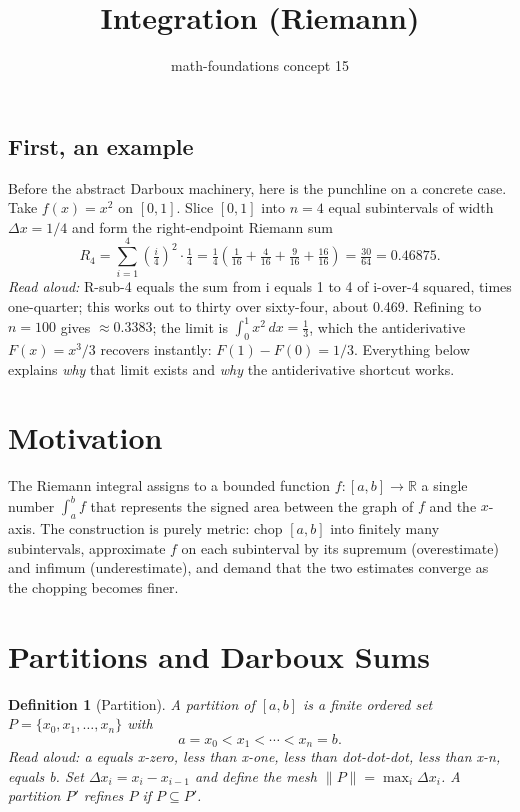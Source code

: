 \documentclass[11pt]{article}
\title{Integration (Riemann)}
\author{math-foundations concept 15}
\date{}
\newtheorem{definition}{Definition}
\begin{document}
\maketitle

\subsection*{First, an example}
Before the abstract Darboux machinery, here is the punchline on a concrete case.
Take $f(x) = x^2$ on $[0,1]$. Slice $[0,1]$ into $n=4$ equal subintervals of width
$\Delta x = 1/4$ and form the right-endpoint Riemann sum
\[ R_4 = \sum_{i=1}^{4} \left(\tfrac{i}{4}\right)^2 \cdot \tfrac{1}{4}
       = \tfrac{1}{4}\!\left(\tfrac{1}{16} + \tfrac{4}{16} + \tfrac{9}{16} + \tfrac{16}{16}\right)
       = \tfrac{30}{64} = 0.46875. \]
\emph{Read aloud:} R-sub-4 equals the sum from i equals 1 to 4 of i-over-4 squared, times one-quarter; this works out to thirty over sixty-four, about 0.469.
Refining to $n=100$ gives $\approx 0.3383$; the limit is $\int_0^1 x^2\,dx = \tfrac{1}{3}$,
which the antiderivative $F(x) = x^3/3$ recovers instantly: $F(1) - F(0) = 1/3$.
Everything below explains \emph{why} that limit exists and \emph{why} the antiderivative
shortcut works.

\section{Motivation}
The Riemann integral assigns to a bounded function $f : [a,b] \to \mathbb{R}$ a single
number $\int_a^b f$ that represents the signed area between the graph of $f$ and the
$x$-axis. The construction is purely metric: chop $[a,b]$ into finitely many subintervals,
approximate $f$ on each subinterval by its supremum (over\-estimate) and infimum
(under\-estimate), and demand that the two estimates converge as the chopping becomes
finer.

\section{Partitions and Darboux Sums}

\begin{definition}[Partition]
A \emph{partition} of $[a,b]$ is a finite ordered set
$P = \{x_0, x_1, \dots, x_n\}$ with
\[ a = x_0 < x_1 < \cdots < x_n = b. \]
\emph{Read aloud:} a equals x-zero, less than x-one, less than dot-dot-dot, less than x-n, equals b.
Set $\Delta x_i = x_i - x_{i-1}$ and define the \emph{mesh} $\|P\| = \max_i \Delta x_i$.
A partition $P'$ \emph{refines} $P$ if $P \subseteq P'$.
\end{definition}
\end{document}
